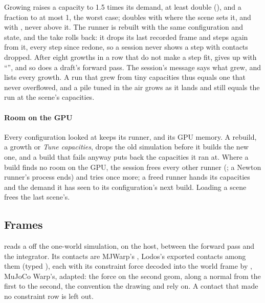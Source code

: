 Growing raises a capacity to 1.5 times its demand, at least double (), and a fraction to at most 1, the worst case;  doubles with  where the scene sets it, and  with , never above it. The runner is rebuilt with the same configuration and state, and the take rolls back: it drops its last recorded frame and steps again from it, every step since redone, so a session never shows a step with contacts dropped. After eight growths in a row that do not make a step fit,  gives up with ``'', and so does a draft's forward pass. The session's message says what grew, and  lists every growth. A run that grew from tiny capacities thus equals one that never overflowed, and a pile tuned in the air grows as it lands and still equals the run at the scene's capacities.

\paragraph{Room on the GPU} Every configuration looked at keeps its runner, and its GPU memory. A rebuild, a growth or \emph{Tune capacities}, drops the old simulation before it builds the new one, and a build that fails anyway puts back the capacities it ran at. Where a build finds no room on the GPU, the session frees every other runner (; a Newton runner's process ends) and tries once more; a freed runner hands its capacities and the demand it has seen to its configuration's next build. Loading a scene frees the last scene's.

\subsection{Frames}\label{sec:frames}

 reads a  off the one-world simulation, on the host, between the forward pass and the integrator. Its contacts are MJWarp's , Lodos's exported contacts among them (typed ), each with its constraint force decoded into the world frame by , MuJoCo Warp's, adapted: the force on the second geom, along a normal from the first to the second, the convention the drawing and  rely on. A contact that made no constraint row is left out.


